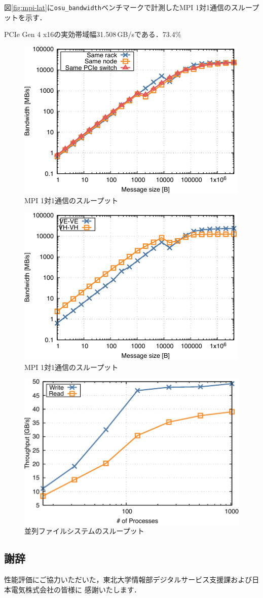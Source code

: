 ﻿\documentclass[submit,techrep,noauthor]{ipsj}
\begin{document}
図\ref{fig:mpi-lat}に\verb|osu_bandwidth|ベンチマークで計測したMPI 1対1通信のスループットを示す．

PCIe Gen 4 x16の実効帯域幅31.508\,GB/sである．73.4\%

\begin{figure}
  \centering
  \includegraphics{figs/mpi_bandwidth.pdf}
  \caption{MPI 1対1通信のスループット}\label{fig:bw}
\end{figure}

\begin{figure}
  \centering
  \includegraphics{figs/mpi_bandwidth_vhve.pdf}
  \caption{MPI 1対1通信のスループット}\label{fig:bw-vh}
\end{figure}

\begin{figure}
  \centering
  \includegraphics{figs/ior.pdf}
  \caption{並列ファイルシステムのスループット}\label{fig:ior}
\end{figure}

\subsection*{謝辞}

性能評価にご協力いただいた，東北大学情報部デジタルサービス支援課および日本電気株式会社の皆様に
感謝いたします．
\end{document}
